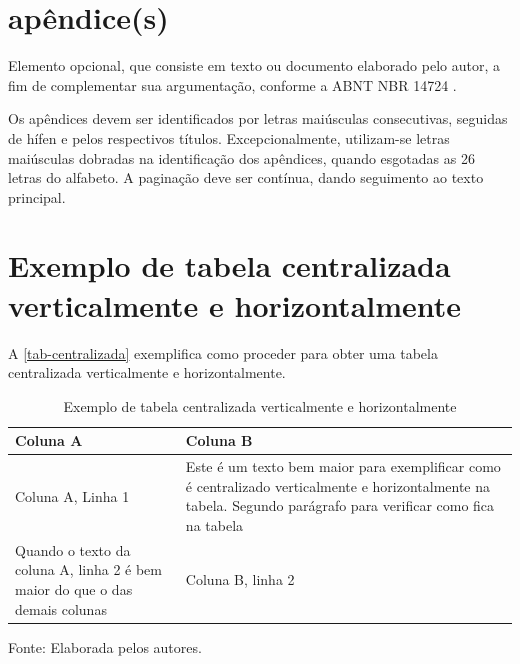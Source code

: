 
\begin{apendicesenv}
\partapendices
\chapter{apêndice(s)}
Elemento opcional, que consiste em texto ou documento elaborado pelo autor, a fim de complementar sua argumentação, conforme a ABNT NBR 14724 \cite{nbr14724}.

Os apêndices devem ser identificados por letras maiúsculas consecutivas, seguidas de hífen e pelos respectivos títulos. Excepcionalmente, utilizam-se letras maiúsculas dobradas na identificação dos apêndices, quando esgotadas as 26 letras do alfabeto. A paginação deve ser contínua, dando seguimento ao texto principal. \cite{aguia2020}
\chapter{Exemplo de tabela centralizada verticalmente e horizontalmente}
A \autoref{tab-centralizada} exemplifica como proceder para obter uma tabela centralizada verticalmente e horizontalmente.
\begin{table}[htbp]
\ABNTEXfontereduzida
\caption[Exemplo de tabela centralizada verticalmente e horizontalmente]{Exemplo de tabela centralizada verticalmente e horizontalmente}
\label{tab-centralizada}

\begin{tabular}{ >{\centering\arraybackslash}m{6cm}  >{\centering\arraybackslash}m{6cm} }
\hline
 \centering \textbf{Coluna A} & \textbf{Coluna B}\\
\hline
  Coluna A, Linha 1 & Este é um texto bem maior para exemplificar como é centralizado verticalmente e horizontalmente na tabela. Segundo parágrafo para verificar como fica na tabela\\
  Quando o texto da coluna A, linha 2 é bem maior do que o das demais colunas  & Coluna B, linha 2\\
\hline
\end{tabular}
\begin{flushleft}
		Fonte: Elaborada pelos autores.\
\end{flushleft}
\end{table}


\end{apendicesenv}
